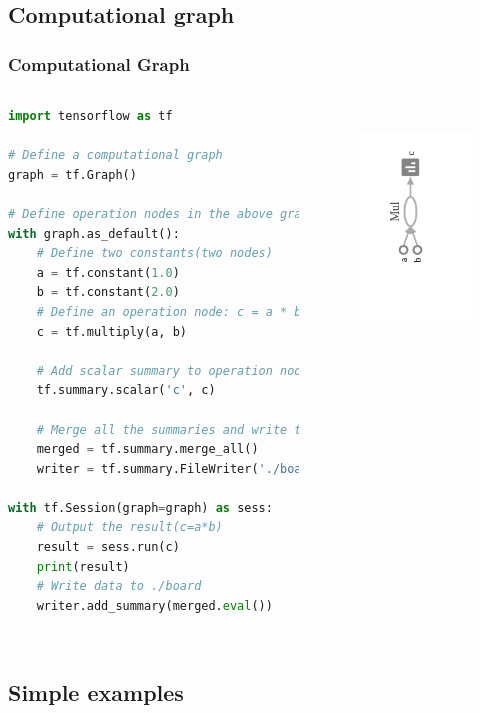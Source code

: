 \subsection{Computational graph}

\begin{frame}[fragile]
  \MyLogo
  \frametitle{Computational Graph}  
%  
\begin{columns}
\tiny{
\begin{lstlisting}[language=python]
import tensorflow as tf

# Define a computational graph
graph = tf.Graph()

# Define operation nodes in the above graph
with graph.as_default():
	# Define two constants(two nodes)
	a = tf.constant(1.0)
	b = tf.constant(2.0)
	# Define an operation node: c = a * b
	c = tf.multiply(a, b)
	
	# Add scalar summary to operation node
	tf.summary.scalar('c', c)
	
	# Merge all the summaries and write to ./board
	merged = tf.summary.merge_all()
	writer = tf.summary.FileWriter('./board', graph)

with tf.Session(graph=graph) as sess:
	# Output the result(c=a*b)
	result = sess.run(c)
	print(result)
	# Write data to ./board
	writer.add_summary(merged.eval())
	
\end{lstlisting}
}
%
\begin{figure}[htbp] 
   \includegraphics[height=2.5in]{figures/compgraph.png} 
\end{figure}
%
\end{columns}

\end{frame}

\subsection{Simple examples}

